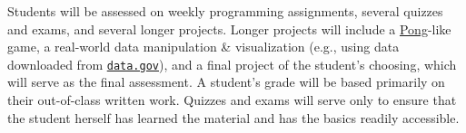 \documentclass[12pt]{article}
\begin{document}
Students will be assessed on weekly programming assignments, several quizzes
and exams, and several longer projects. Longer projects will include a
\href{http://www.ponggame.org/}{Pong}-like game, a real-world data
manipulation \& visualization (e.g., using data downloaded from
\href{http://data.gov}{\texttt{data.gov}}), and a final project of the
student's choosing, which will serve as the final assessment.
A student's grade will be based primarily on their out-of-class written work.
Quizzes and exams will serve only to ensure that the student herself has
learned the material and has the basics readily accessible.
\end{document}
